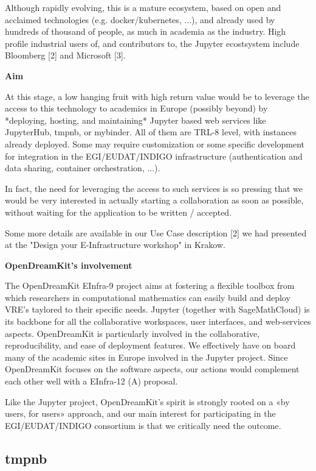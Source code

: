 Although rapidly evolving, this is a mature ecosystem, based on open
and acclaimed technologies (e.g. docker/kubernetes, ...), and already
used by hundreds of thousand of people, as much in academia as the
industry. High profile industrial users of, and contributors to, the
Jupyter ecostsystem include Bloomberg [2] and Microsoft [3].

\textbf{Aim}

At this stage, a low hanging fruit with high return value would be to
leverage the access to this technology to academics in Europe
(possibly beyond) by *deploying, hosting, and maintaining* Jupyter
based web services like JupyterHub, tmpnb, or mybinder. All of them
are TRL-8 level, with instances already deployed. Some may require
customization or some specific development for integration in the
EGI/EUDAT/INDIGO infrastructure (authentication and data sharing,
container orchestration, ...).

In fact, the need for leveraging the access to such services is so
pressing that we would be very interested in actually starting a
collaboration as soon as possible, without waiting for the application
to be written / accepted.

Some more details are available in our Use Case description [2] we had
presented at the "Design your E-Infrastructure workshop" in Krakow.

\textbf{OpenDreamKit's involvement}

The OpenDreamKit EInfra-9 project aims at fostering a flexible toolbox
from which researchers in computational mathematics can easily build
and deploy VRE's taylored to their specific needs. Jupyter (together
with SageMathCloud) is its backbone for all the collaborative
workspaces, user interfaces, and web-services aspects. OpenDreamKit is
particularly involved in the collaborative, reproducibility, and ease
of deployment features. We effectively have on board many of the
academic sites in Europe involved in the Jupyter project. Since
OpenDreamKit focuses on the software aspects, our actions would
complement each other well with a EInfra-12 (A) proposal.

Like the Jupyter project, OpenDreamKit's spirit is strongly rooted on
a «by users, for users» approach, and our main interest for
participating in the EGI/EUDAT/INDIGO consortium is that we critically
need the outcome.

\subsection{tmpnb}

